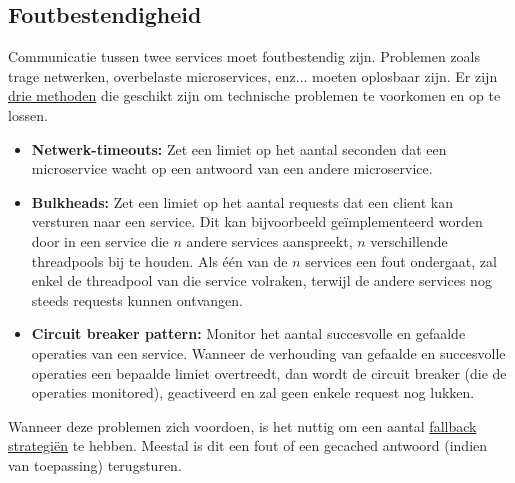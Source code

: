 	\subsection{Foutbestendigheid}
	Communicatie tussen twee services moet foutbestendig zijn. Problemen zoals trage netwerken, overbelaste microservices, enz... moeten oplosbaar zijn. Er zijn \uline{drie methoden} die geschikt zijn om technische problemen te voorkomen en op te lossen.
	\begin{itemize}
		\item[\info] \textbf{Netwerk-timeouts:} Zet een limiet op het aantal seconden dat een microservice wacht op een antwoord van een andere microservice.
		\item[\info] \textbf{Bulkheads:} Zet een limiet op het aantal requests dat een client kan versturen naar een service. Dit kan bijvoorbeeld geïmplementeerd worden door in een service die $n$ andere services aanspreekt, $n$ verschillende threadpools bij te houden. Als één van de $n$ services een fout ondergaat, zal enkel de threadpool van die service volraken, terwijl de andere services nog steeds requests kunnen ontvangen.
		\item[\info] \textbf{Circuit breaker pattern:} Monitor het aantal succesvolle en gefaalde operaties van een service. Wanneer de verhouding van gefaalde en succesvolle operaties een bepaalde limiet overtreedt, dan wordt de circuit breaker (die de operaties monitored), geactiveerd en zal geen enkele request nog lukken.
	\end{itemize}
	Wanneer deze problemen zich voordoen, is het nuttig om een aantal \uline{fallback strategiën} te hebben. Meestal is dit een fout of een gecached antwoord (indien van toepassing) terugsturen.
